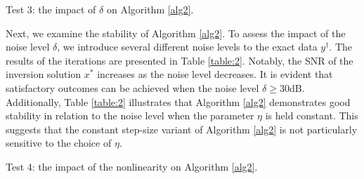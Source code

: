 \documentclass[a4paper,12pt]{article}
\numberwithin{equation}{section}
\begin{document}
\par Test 3: the impact of $\delta$ on Algorithm \ref{alg2}.

\par Next, we examine the stability of Algorithm \ref{alg2}. To assess the impact of the noise level $\delta$, we introduce several different noise levels to the exact data $y^{\dagger}$. The results of the iterations are presented in Table \ref{table:2}. Notably, the SNR of the inversion solution $x^{*}$ increases as the noise level decreases. It is evident that satisfactory outcomes can be achieved when the noise level $\delta\geq 30$dB. Additionally, Table \ref{table:2} illustrates that Algorithm \ref{alg2} demonstrates good stability in relation to the noise level when the parameter $\eta$ is held constant. This suggests that the constant step-size variant of Algorithm \ref{alg2} is not particularly sensitive to the choice of $\eta$.

\begin{table}[H]
\caption{{\rm SNR} of reconstruction $x^{*}$ with several noise levels when $c=2$ and $d=3$.}
\label{table:2}
\centering
\tabcolsep=0.35cm
\linewidth
{}
\end{table}

\par Test 4:  the impact of the nonlinearity on Algorithm \ref{alg2}.
\end{document}
